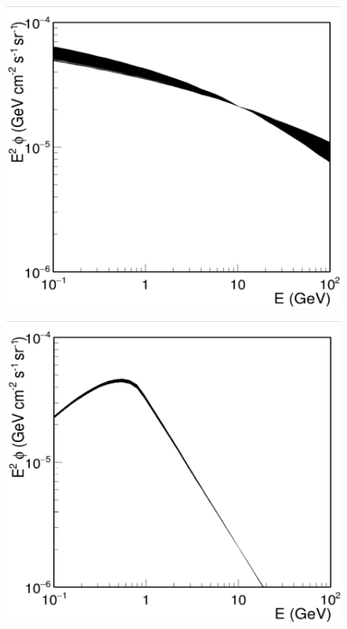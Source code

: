 \begin{figure}[h]
  \centering
  \begin{minipage}[h]{0.45\textwidth}
  	\centering
	\includegraphics[trim={0 0cm 0 0.2cm}, clip, width=1.\linewidth]{pic/method/IC_variations.png}
 	\subcaption{}
 	\label{fig:IC_variations}
  \end{minipage}
  \hfill
  \begin{minipage}[h]{0.45\textwidth}
	  \centering
	  \includegraphics[trim={0 0cm 0 0.2cm}, clip, width=1.\linewidth]{pic/method/BR_variations.png}

\end{minipage}
\end{figure}
